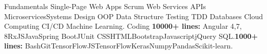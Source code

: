 \vspace{-3mm}
\begin{cvskills}
\vspace{1.5mm}\cvskill
    {Fundamentals}
    {Single-Page Web Apps \skilltypestyle{\textbf{|}} Scrum \skilltypestyle{\textbf{ |}} Web Services APIs \skilltypestyle{\textbf{ |}} Microservices\skilltypestyle{\textbf{ | }}Systems Design\skilltypestyle{\textbf{ |}} OOP \skilltypestyle{\textbf{|}} Data Structure \skilltypestyle{\textbf{ |}}\newline Testing\skilltypestyle{\textbf{ |}} TDD \skilltypestyle{\textbf{ |}} Databases\skilltypestyle{\textbf{ |}} Cloud Computing\skilltypestyle{\textbf{ |}} CI/CD\skilltypestyle{\textbf{ |}} Machine Learning.}
\vspace{1.5mm}\cvskill
     {Coding}
    {\textbf{10000+ lines:} Angular 4,7, 8\skilltypestyle{\textbf{ | }}RxJS\skilltypestyle{\textbf{ | }}Java\skilltypestyle{\textbf{ | }}Spring Boot\skilltypestyle{\textbf{ | }}JUnit \skilltypestyle{\textbf{ | }}CSS\skilltypestyle{\textbf{ | }}HTML\skilltypestyle{\textbf{ | }}Bootstrap\skilltypestyle{\textbf{ | }}Javascript\skilltypestyle{\textbf{ | }}jQuery \skilltypestyle{\textbf{ | }}SQL.\newline \textbf{1000+ lines:} Bash\skilltypestyle{\textbf{ | }}Git\skilltypestyle{\textbf{ | }}TensorFlowJS\skilltypestyle{\textbf{ | }}TensorFlow\skilltypestyle{\textbf{ | }}Keras\skilltypestyle{\textbf{ | }}Numpy\skilltypestyle{\textbf{ | }}Pandas\skilltypestyle{\textbf{ | }}Scikit-learn.  }          
\end{cvskills}
